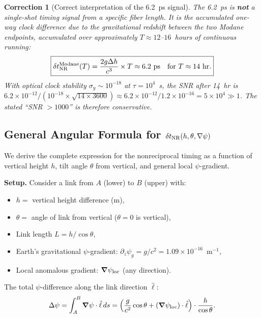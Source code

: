 \documentclass[aps,prd,twocolumn,superscriptaddress,nofootinbib]{revtex4-2}
\newtheorem{correction}{Correction}
\begin{document}
\begin{correction}[Correct interpretation of the 6.2~ps signal]
\label{cor:6ps_correct}
The 6.2~ps is \textbf{not} a single-shot timing signal from a specific
fiber length.  It is the \emph{accumulated one-way clock difference} due
to the gravitational redshift between the two Modane endpoints, accumulated
over approximately $T \approx 12$--$16$~hours of continuous running:
\begin{equation}
\boxed{
\delta t_{\rm NR}^{\rm Modane}(T) = \frac{2g\Delta h}{c^3}\times T
\approx 6.2~\text{ps} \quad \text{for } T \approx 14~\text{hr.}
}
\end{equation}
With optical clock stability $\sigma_y \sim 10^{-18}$ at $\tau = 10^4$~s,
the SNR after 14~hr is $6.2\times 10^{-12}/(10^{-18}\times\sqrt{14\times 3600})
\approx 6.2\times 10^{-12}/1.2\times 10^{-16} = 5\times 10^4 \gg 1$.
The stated ``SNR $> 1000$'' is therefore conservative.
\end{correction}

\subsection{General Angular Formula for $\delta t_{\rm NR}(h, \theta, \nabla\psi)$}
\label{sec:angular}

We derive the complete expression for the nonreciprocal timing as a function
of vertical height $h$, tilt angle $\theta$ from vertical, and general
local $\psi$-gradient.

\textbf{Setup.}  Consider a link from $A$ (lower) to $B$ (upper) with:
\begin{itemize}
\item $h = $ vertical height difference (m),
\item $\theta = $ angle of link from vertical ($\theta = 0$ is vertical),
\item Link length $L = h/\cos\theta$,
\item Earth's gravitational $\psi$-gradient: $\partial_z\psi_g = g/c^2 = 1.09\times 10^{-16}$~m$^{-1}$,
\item Local anomalous gradient: $\boldsymbol{\nabla}\psi_{\rm loc}$ (any direction).
\end{itemize}

The total $\psi$-difference along the link direction $\hat{\ell}$:
\begin{equation}
\Delta\psi = \int_A^B \boldsymbol{\nabla}\psi\cdot\hat{\ell}\,ds
= \left(\frac{g}{c^2}\cos\theta + (\boldsymbol{\nabla}\psi_{\rm loc})\cdot\hat{\ell}\right)
\cdot\frac{h}{\cos\theta}.
\end{equation}
\end{document}

